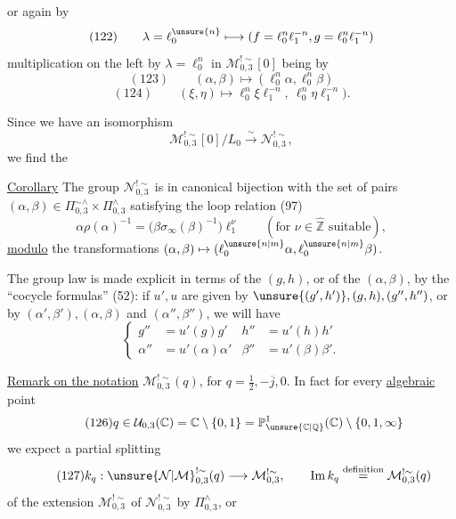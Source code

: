 or again by
\[
 (122)\qquad
 \lambda=\ell_0^{\unsure{n}}\longmapsto
 (f=\ell_0^n\ell_1^{-n},g=\ell_0^n\ell_1^{-n})
\]
multiplication  on the left by 
$\lambda=\ell_0^n$ in $\mathcal M_{0,3}^{!\sim}[0]$
being  by
\[
 (123)\qquad
 (\alpha,\beta)\longmapsto(\ell_0^n\alpha,\ell_0^n\beta)
\]
\[
 (124)\qquad
 (\xi,\eta)\longmapsto
 \ell_0^n\xi\ell_1^{-n},\ \ell_0^n\eta\ell_1^{-n}).
\]


Since we have an isomorphism
\[
\mathcal M_{0,3}^{!\sim}[0]/L_0
\xrightarrow{\sim}\mathcal N_{0,3}^{!\sim},
\]
we find the

\uline{Corollary} The group $\mathcal N_{0,3}^{!\sim}$ is in canonical bijection
with the set of pairs
$(\alpha,\beta)\in\Pi_{0,3}^{\sim\wedge}\times\Pi_{0,3}^{\wedge}$
satisfying the loop relation (97)
\[
\alpha\rho(\alpha)^{-1}
=\bigl(\beta\sigma_\infty(\beta)^{-1}\bigr)\ell_1^\nu
\qquad(\text{for }\nu\in\widehat{\mathbb Z}\text{ suitable}),
\]
\uline{modulo} the transformations
$(\alpha,\beta)\mapsto(\ell_0^{\unsure{n|m}}\alpha,\ell_0^{\unsure{n|m}}\beta)$.

The group law  is made explicit in terms of the $(g,h)$, or of the
$(\alpha,\beta)$, by the ``cocycle formulas'' (52): if $u',u$
 are given by
$\unsure{(g',h')},(g,h),(g'',h'')$, or by
$(\alpha',\beta'),(\alpha,\beta)$ and $(\alpha'',\beta'')$, we will have
\[
\tag{125}
\left\{
\begin{aligned}
g''&=u'(g)g'&h''&=u'(h)h'\\
\alpha''&=u'(\alpha)\alpha'&\beta''&=u'(\beta)\beta'.
\end{aligned}
\right.
\]

\uline{Remark on the notation} $\mathcal M_{0,3}^{!\sim}(q)$,
for $q=\frac12,-\overline j,0$.
In fact for every \uline{algebraic} point
\[
\tag{126}
q\in\mathcal U_{0,3}(\mathbb C)
=\mathbb C\setminus\{0,1\}
=\mathbb P^1_{\unsure{\mathbb C|\mathbb Q}}(\mathbb C)
\setminus\{0,1,\infty\}
\]
we expect  a partial splitting
\[
\tag{127}
k_q:\unsure{\mathcal N|\mathcal M}_{0,3}^{!\sim}(q)\longrightarrow\mathcal M_{0,3}^{!\sim},
\qquad\operatorname{Im}k_q\overset{\text{definition}}=\mathcal M_{0,3}^{!\sim}(q)
\]
of the extension $\mathcal M_{0,3}^{!\sim}$ of
$\mathcal N_{0,3}^{!\sim}$ by $\Pi_{0,3}^{\wedge}$, or

